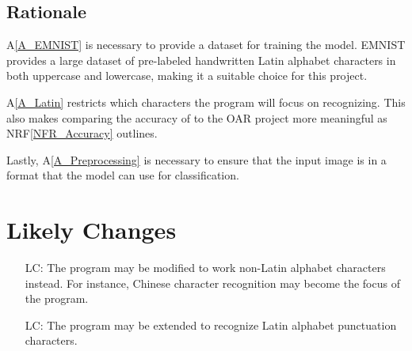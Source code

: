\documentclass[12pt]{article}
\newcounter{lcnum} %
\begin{document}
\begin{itemize}


\end{itemize}

\subsection{Rationale}


A\ref{A_EMNIST} is necessary to provide a dataset for training the model. EMNIST
provides a large dataset of pre-labeled handwritten Latin alphabet characters in
both uppercase and lowercase, making it a suitable choice for this project.

A\ref{A_Latin} restricts which characters the program will focus on
recognizing. This also makes comparing the accuracy of \progname{} to the OAR project
more meaningful as NRF\ref{NFR_Accuracy} outlines.

Lastly, A\ref{A_Preprocessing} is necessary to ensure that the input image is in
a format that the model can use for classification.


\section{Likely Changes}    

\noindent \begin{itemize}

\item[LC\refstepcounter{lcnum}\thelcnum\label{LC_Language}:] The program may be
modified to work non-Latin alphabet characters instead. For instance, Chinese
character recognition may become the focus of the program.
\item[LC\refstepcounter{lcnum}\thelcnum\label{LC_Punctuation}:] The program may
be extended to recognize Latin alphabet punctuation characters.

\end{itemize}
\end{document}
